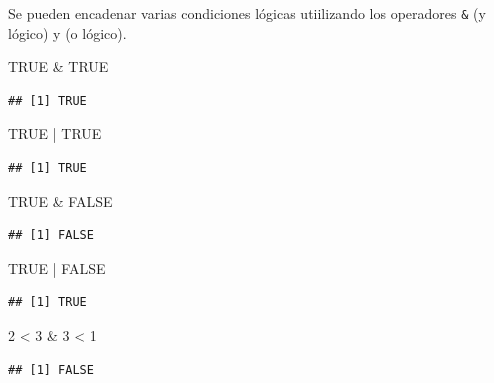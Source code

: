 \documentclass[
]{book}
\newenvironment{Shaded}{\begin{snugshade}}{\end{snugshade}}
\newcommand{\ConstantTok}[1]{\textcolor[rgb]{0.00,0.00,0.00}{#1}}
\newcommand{\DecValTok}[1]{\textcolor[rgb]{0.00,0.00,0.81}{#1}}
\newcommand{\SpecialCharTok}[1]{\textcolor[rgb]{0.00,0.00,0.00}{#1}}
\theoremstyle{break}
\theoremstyle{nonumberplain}
\begin{document}
Se pueden encadenar varias condiciones lógicas utiilizando
los operadores \texttt{\&} (y lógico) y \texttt{\textbar{}} (o lógico).

\begin{Shaded}
\begin{Highlighting}[]
\ConstantTok{TRUE} \SpecialCharTok{\&} \ConstantTok{TRUE}
\end{Highlighting}
\end{Shaded}

\begin{verbatim}
## [1] TRUE
\end{verbatim}

\begin{Shaded}
\begin{Highlighting}[]
\ConstantTok{TRUE} \SpecialCharTok{|} \ConstantTok{TRUE}
\end{Highlighting}
\end{Shaded}

\begin{verbatim}
## [1] TRUE
\end{verbatim}

\begin{Shaded}
\begin{Highlighting}[]
\ConstantTok{TRUE} \SpecialCharTok{\&} \ConstantTok{FALSE}
\end{Highlighting}
\end{Shaded}

\begin{verbatim}
## [1] FALSE
\end{verbatim}

\begin{Shaded}
\begin{Highlighting}[]
\ConstantTok{TRUE} \SpecialCharTok{|} \ConstantTok{FALSE}
\end{Highlighting}
\end{Shaded}

\begin{verbatim}
## [1] TRUE
\end{verbatim}

\begin{Shaded}
\begin{Highlighting}[]
\DecValTok{2} \SpecialCharTok{\textless{}} \DecValTok{3} \SpecialCharTok{\&} \DecValTok{3} \SpecialCharTok{\textless{}} \DecValTok{1}
\end{Highlighting}
\end{Shaded}

\begin{verbatim}
## [1] FALSE
\end{verbatim}
\end{document}
